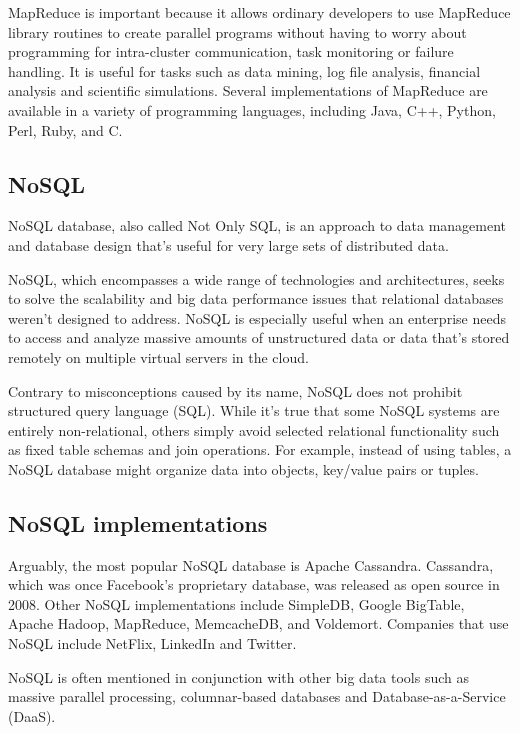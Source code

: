 \documentclass[11pt]{article} %
\begin{document}
MapReduce is important because it allows ordinary developers to use MapReduce library routines to create parallel programs without having to worry about programming for intra-cluster communication, task monitoring or failure handling. It is useful for tasks such as data mining, log file analysis, financial analysis and scientific simulations. Several implementations of MapReduce are available in a variety of programming languages, including Java, C++, Python, Perl, Ruby, and C.

\newpage
\subsection{NoSQL}

NoSQL database, also called Not Only SQL, is an approach to data management and database design that's useful for very large sets of distributed data.

NoSQL, which encompasses a wide range of technologies and architectures, seeks to solve the scalability and big data performance issues that relational databases weren’t designed to address. NoSQL is especially useful when an enterprise needs to access and analyze massive amounts of unstructured data or data that's stored remotely on multiple virtual servers in the cloud.

Contrary to misconceptions caused by its name, NoSQL does not prohibit structured query language (SQL). While it's true that some NoSQL systems are entirely non-relational, others simply avoid selected relational functionality such as fixed table schemas and join operations. For example, instead of using tables, a NoSQL database might organize data into objects, key/value pairs or tuples.

\subsection{NoSQL implementations}
Arguably, the most popular NoSQL database is Apache Cassandra. Cassandra, which was once Facebook’s proprietary database, was released as open source in 2008. Other NoSQL implementations include SimpleDB, Google BigTable, Apache Hadoop, MapReduce, MemcacheDB, and Voldemort. Companies that use NoSQL include NetFlix, LinkedIn and Twitter.

NoSQL is often mentioned in conjunction with other big data tools such as massive parallel processing, columnar-based databases and Database-as-a-Service (DaaS).
\end{document}
